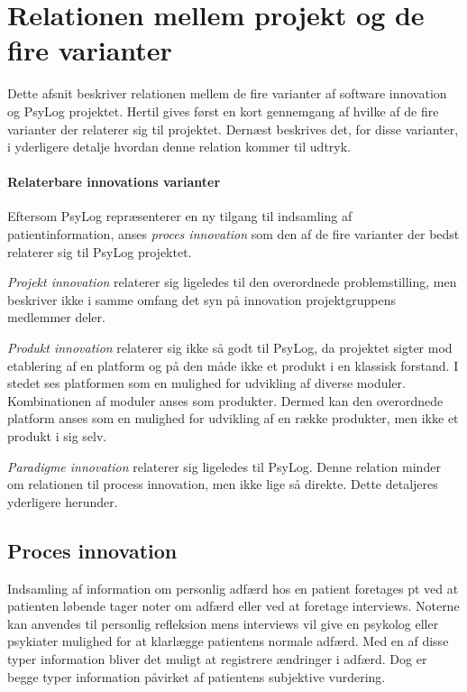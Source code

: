 \section{Relationen mellem projekt og de fire varianter}
Dette afsnit beskriver relationen mellem de fire varianter af software innovation\cite[Afsnit 5.1, Side 30-32]{art:essence} og PsyLog projektet.
Hertil gives først en kort gennemgang af hvilke af de fire varianter der relaterer sig til projektet.
Dernæst beskrives det, for disse varianter, i yderligere detalje hvordan denne relation kommer til udtryk.

\paragraph{Relaterbare innovations varianter}
Eftersom PsyLog repræsenterer en ny tilgang til indsamling af patientinformation, anses \textit{proces innovation} som den af de fire varianter der bedst relaterer sig til PsyLog projektet.

\textit{Projekt innovation} relaterer sig ligeledes til den overordnede problemstilling, men beskriver ikke i samme omfang det syn på innovation projektgruppens medlemmer deler.

\textit{Produkt innovation} relaterer sig ikke så godt til PsyLog, da projektet sigter mod etablering af en platform og på den måde ikke et produkt i en klassisk forstand.
I stedet ses platformen som en mulighed for udvikling af diverse moduler.
Kombinationen af moduler anses som produkter.
Dermed kan den overordnede platform anses som en mulighed for udvikling af en række produkter, men ikke et produkt i sig selv.

\textit{Paradigme innovation} relaterer sig ligeledes til PsyLog.
Denne relation minder om relationen til process innovation, men ikke lige så direkte.
Dette detaljeres yderligere herunder.


\subsection{Proces innovation}
Indsamling af information om personlig adfærd hos en patient foretages pt ved at patienten løbende tager noter om adfærd eller ved at foretage interviews.
Noterne kan anvendes til personlig refleksion mens interviews vil give en psykolog eller psykiater mulighed for at klarlægge patientens normale adfærd.
Med en af disse typer information bliver det muligt at registrere ændringer i adfærd.
Dog er begge typer information påvirket af patientens subjektive vurdering.

